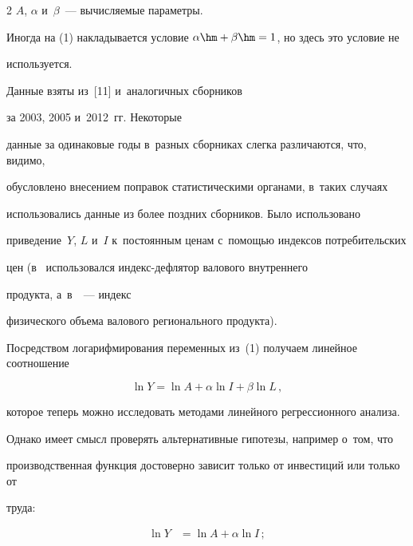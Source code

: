 \begin{multicols}{2}
  $A$, $\alpha$ и~$\beta$~--- вычисляемые параметры.


  


  Иногда на (1) накладывается условие $\alpha\hm+\beta\hm=1$, но здесь это условие не 


используется.


  


  Данные взяты из~[11] и~аналогичных сборников\linebreak


   за 2003, 2005 и~2012~гг. Некоторые 


данные за одинаковые годы в~разных сборниках слегка различаются, что, видимо, 


обусловлено внесением поправок статистическими органами, в~таких случаях\linebreak 


использовались данные из более поздних сборников. Было использовано 


приведение~$Y$, $L$ и~$I$ к~постоянным ценам с~по\-мощью индексов потребительских 


цен (в~\cite{7-ki} использовался ин\-декс-дефля\-тор валового внут\-рен\-не\-го


продукта, а~в~\cite{8-ki}~--- индекс 


физического объема валового регионального продукта).


  


  Посредством логарифмирования переменных из~(1) получаем линейное соотношение


  \begin{equation}


  \ln Y=\ln A+\alpha \ln I+\beta \ln L\,,


  \end{equation}


которое теперь можно исследовать методами линейного регрессионного анализа.


  


  Однако имеет смысл проверять альтернативные гипотезы, например о~том, что 


производственная функция достоверно зависит только от инвестиций или только от 


труда: 


  \begin{align}


  \ln Y&= \ln A+\alpha \ln I\,;\label{e-ki}\\



\end{align}
\end{multicols}

